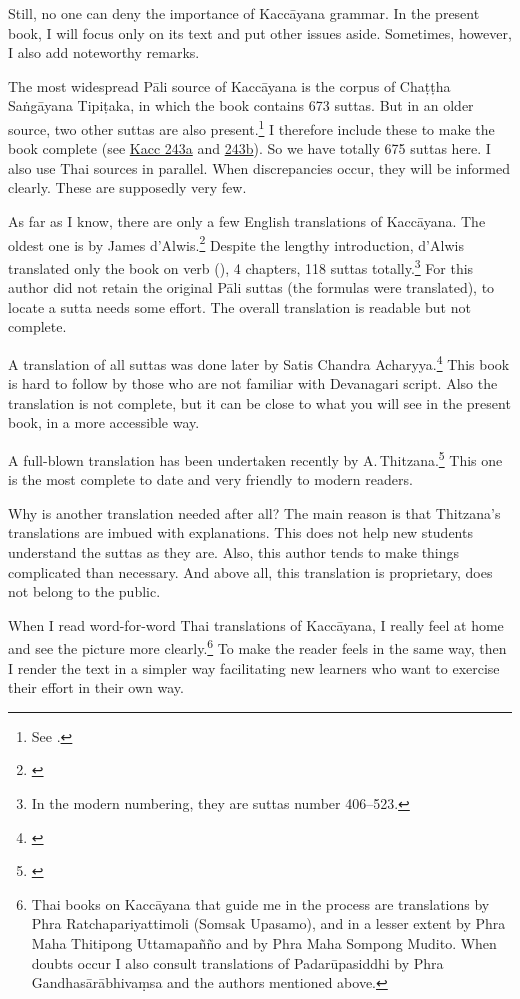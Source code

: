 Still, no one can deny the importance of Kaccāyana grammar. In the present book, I will focus only on its text and put other issues aside. Sometimes, however, I also add noteworthy remarks.

The most widespread Pāli source of Kaccāyana is the corpus of Chaṭṭha Saṅgāyana Tipiṭaka, in which the book contains 673 suttas. But in an older source, two other suttas are also present.\footnote{See \citealp[p.~221]{thitzana:kacc1}.} I therefore include these to make the book complete (see \hyperref[sut:243a]{Kacc 243a} and \hyperref[sut:243b]{243b}). So we have totally 675 suttas here. I also use Thai sources in parallel. When discrepancies occur, they will be informed clearly. These are supposedly very few.

As far as I know, there are only a few English translations of Kaccāyana. The oldest one is by James d'Alwis.\footnote{\citealp{dalwis:kach}} Despite the lengthy introduction, d'Alwis translated only the book on verb (), 4 chapters, 118 suttas totally.\footnote{In the modern numbering, they are suttas number 406--523.} For this author did not retain the original Pāli suttas (the formulas were translated), to locate a sutta needs some effort. The overall translation is readable but not complete.

A translation of all suttas was done later by Satis Chandra Acharyya.\footnote{\citealp{satis:kacc}} This book is hard to follow by those who are not familiar with Devanagari script. Also the translation is not complete, but it can be close to what you will see in the present book, in a more accessible way.

A full-blown translation has been undertaken recently by A.\,Thitzana.\footnote{\citealp{thitzana:kacc2}} This one is the most complete to date and very friendly to modern readers.

Why is another translation needed after all? The main reason is that Thitzana's translations are imbued with explanations. This does not help new students understand the suttas as they are. Also, this author tends to make things complicated than necessary. And above all, this translation is proprietary, does not belong to the public.

When I read word-for-word Thai translations of Kaccāyana, I really feel at home and see the picture more clearly.\footnote{Thai books on Kaccāyana that guide me in the process are translations by Phra Ratchapariyattimoli (Somsak Upasamo), and in a lesser extent by Phra Maha Thitipong Uttamapañño and by Phra Maha Sompong Mudito. When doubts occur I also consult translations of Padarūpasiddhi by Phra Gandhasārābhivaṃsa and the authors mentioned above.} To make the reader feels in the same way, then I render the text in a simpler way facilitating new learners who want to exercise their effort in their own way.

